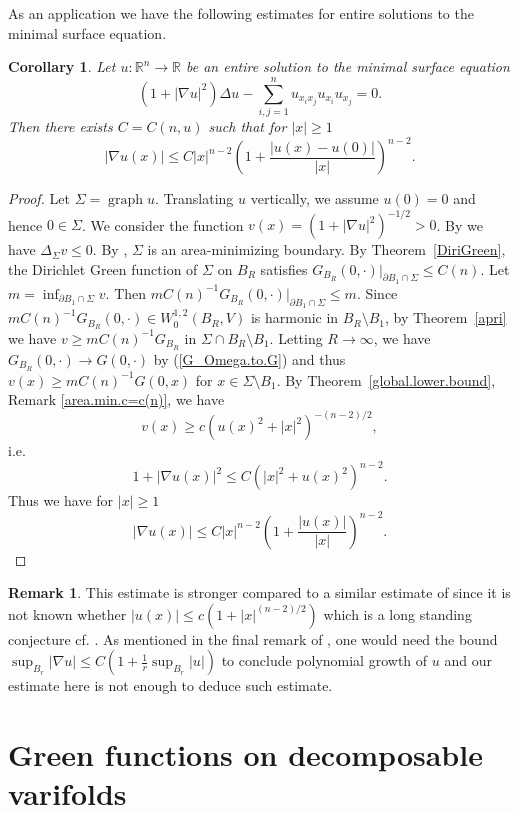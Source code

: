 \documentclass[11pt]{amsart}
\newtheorem{corollary}[theorem]{Corollary}
\theoremstyle{definition}
\newtheorem{remark}[theorem]{Remark}
\newcommand{\R}{\mathbb{R}}
\DeclareMathOperator{\graph}{graph}
\begin{document}
As an application we have the following estimates for entire solutions to the minimal surface equation.
\begin{corollary}
	Let $u:\R^n\to \R$  be an entire solution to the minimal surface equation 
	\[(1+|\nabla u|^2)\Delta u-\sum_{i,j=1}^nu_{x_ix_j}u_{x_i}u_{x_j}=0.\]
	Then there exists $C=C(n,u)$ such that for $|x|\ge 1$
	\[|\nabla u(x)|\le C|x|^{n-2}\left(1+\frac{|u(x)-u(0)|}{|x|}\right)^{n-2}.\]
\end{corollary}

\begin{proof}
	Let $\Sigma=\graph u$. Translating $u$ vertically, we assume $u(0)=0$ and hence $0\in \Sigma$. We consider the function $v(x)=(1+|\nabla u|^2)^{-1/2}>0$. By \cite[2.8]{simon1987asymptotic} we have $\Delta_\Sigma v\le 0$.  By \cite[\S 3]{simon1983survey}, $\Sigma$ is an area-minimizing boundary. By Theorem~\ref{DiriGreen}, the Dirichlet Green function of $\Sigma$ on $B_R$ satisfies $G_{B_R}(0,\cdot)|_{\partial B_1\cap \Sigma}\le C(n)$. Let $m=\inf_{\partial B_1\cap\Sigma}v$. Then $mC(n)^{-1} G_{B_R}(0,\cdot)|_{\partial B_1\cap \Sigma}\le m$. Since $mC(n)^{-1}G_{B_R}(0,\cdot)\in W^{1,2}_0 ( B_R,V)$ is harmonic in $B_R\setminus B_1$, by Theorem~\ref{apri} we have $v\ge mC(n)^{-1} G_{B_R}$ in $\Sigma\cap B_{R}\setminus B_1$. Letting $R\to \infty$, we have $G_{B_R}(0,\cdot)\to G(0,\cdot)$ by (\ref{G_Omega.to.G}) and thus $v(x)\ge mC(n)^{-1} G(0,x)$ for $x\in\Sigma\setminus B_1$. By Theorem~\ref{global.lower.bound}, Remark \ref{area.min.c=c(n)}, we have
	\[v(x)\ge c(u(x)^2+|x|^2)^{-(n-2)/2},\]i.e.
	\[1+|\nabla u(x)|^2\le C(|x|^2+u(x)^2)^{n-2}.\]
	Thus we have for $|x|\ge 1$
	\[|\nabla u(x)|\le C|x|^{n-2}\left(1+\frac{|u(x)|}{|x|}\right)^{n-2}.\]
\end{proof}
\begin{remark}
	This estimate is stronger compared to a similar estimate of \cite[(6.8)]{bombieri1972harnack} since it is not known whether $|u(x)|\le c (1+|x|^{(n-2)/2})$ which is a long standing conjecture cf. \cite{bombieri1972harnack,Yau}. As mentioned in the final remark of \cite{bombieri1972harnack}, one would need the bound $\sup_{B_r}|\nabla u|\le C(1+\frac{1}{r}\sup_{B_r}|u|)$ to conclude polynomial growth of $u$ and our estimate here is not enough to deduce such estimate.
\end{remark}
\section{Green functions on decomposable varifolds}\label{remark.examples}
\end{document}
